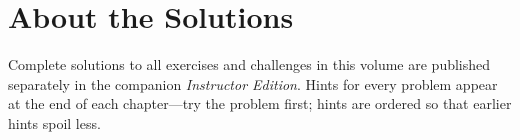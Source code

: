 \documentclass[11pt,a4paper,openany]{book}
\begin{document}


\mainmatter


\ifstudent
  \backmatter
  \chapter*{About the Solutions}
  Complete solutions to all exercises and challenges in this volume are
  published separately in the companion \emph{Instructor Edition}.
  Hints for every problem appear at the end of each chapter---try the
  problem first; hints are ordered so that earlier hints spoil less.
\fi


\end{document}
